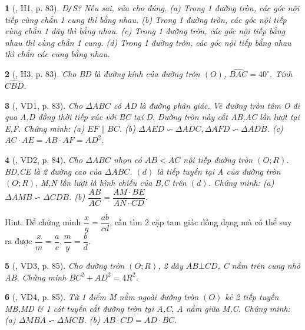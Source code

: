 \documentclass{article}
\newtheorem{baitoan}{}
\begin{document}
\begin{baitoan}[\cite{Binh_boi_duong_Toan_9_tap_2}, H1, p. 83]
	{\rm Đ{\tt/}S?} Nếu sai, sửa cho đúng. (a) Trong 1 đường tròn, các góc nội tiếp cùng chắn 1 cung thì bằng nhau. (b) Trong 1 đường tròn, các góc nội tiếp cùng chắn 1 dây thì bằng nhau. (c) Trong 1 đường tròn, các góc nội tiếp bằng nhau thì cùng chắn 1 cung. (d) Trong 1 đường tròn, các góc nội tiếp bằng nhau thì chắn các cung bằng nhau.
\end{baitoan}

\begin{baitoan}[\cite{Binh_boi_duong_Toan_9_tap_2}, H3, p. 83]
	Cho BD là đường kính của đường tròn $(O)$, $\widehat{BAC} = 40^\circ$. Tính $\widehat{CBD}$.
\end{baitoan}

\begin{baitoan}[\cite{Binh_boi_duong_Toan_9_tap_2}, VD1, p. 83]
	Cho $\Delta ABC$ có AD là đường phân giác. Vẽ đường tròn tâm O đi qua A,D đồng thời tiếp xúc với BC tại D. Đường tròn này cắt AB,AC lần lượt tại E,F. Chứng minh: (a) $EF\parallel BC$. (b) $\Delta AED\backsim\Delta ADC,\Delta AFD\backsim\Delta ADB$. (c) $AC\cdot AE = AB\cdot AF = AD^2$.
\end{baitoan}

\begin{baitoan}[\cite{Binh_boi_duong_Toan_9_tap_2}, VD2, p. 84]
	Cho $\Delta ABC$ nhọn có $AB < AC$ nội tiếp đường tròn $(O;R)$. BD,CE là 2 đường cao của $\Delta ABC$. $(d)$ là tiếp tuyến tại A của đường tròn $(O;R)$, M,N lần lượt là hình chiếu của B,C trên $(d)$. Chứng minh: (a) $\Delta AMB\backsim\Delta CDB$. (b) $\dfrac{AB}{AC} = \dfrac{AM\cdot BE}{AN\cdot CD}$.
\end{baitoan}
{\sf Hint.} Để chứng minh $\dfrac{x}{y} = \dfrac{ab}{cd}$, cần tìm 2 cặp tam giác đồng dạng mà có thể suy ra được $\dfrac{x}{m} = \dfrac{a}{c},\dfrac{m}{y} = \dfrac{b}{d}$.

\begin{baitoan}[\cite{Binh_boi_duong_Toan_9_tap_2}, VD3, p. 85]
	Cho đường tròn $(O;R)$, 2 dây $AB\bot CD$, C nằm trên cung nhỏ AB. Chứng minh $BC^2 + AD^2 = 4R^2$.
\end{baitoan}

\begin{baitoan}[\cite{Binh_boi_duong_Toan_9_tap_2}, VD4, p. 85]
	Từ 1 điểm M nằm ngoài đường tròn $(O)$ kẻ 2 tiếp tuyến MB,MD \& 1 cát tuyến cắt đường tròn tại A,C, A nằm giữa M,C. Chứng minh: (a) $\Delta MBA\backsim\Delta MCB$. (b) $AB\cdot CD = AD\cdot BC$.
\end{baitoan}
\end{document}
